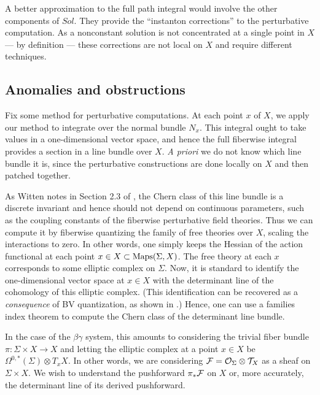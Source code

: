 A better approximation to the full path integral would involve the other components of $Sol$. 
They provide the ``instanton corrections'' to the perturbative computation.
As a nonconstant solution is not concentrated at a single point in $X$ --- by definition --- 
these corrections are not local on $X$ and require different techniques.

\subsection{Anomalies and obstructions}

Fix some method for perturbative computations.
At each point $x$ of $X$, we apply our method to integrate over the normal bundle $N_x$.
This integral ought to take values in a one-dimensional vector space, and 
hence the full fiberwise integral provides a section in a line bundle over $X$.
{\em A priori} we do not know which line bundle it is, 
since the perturbative constructions are done locally on $X$ and then patched together.

As Witten notes in Section 2.3 of \cite{WittenCDO}, the Chern class of this line bundle is a discrete invariant and 
hence should not depend on continuous parameters, 
such as the coupling constants of the fiberwise perturbative field theories.
Thus we can compute it by fiberwise quantizing the family of free theories over $X$,
scaling the interactions to zero.
In other words, one simply keeps the Hessian of the action functional at each point $x \in X \subset {\rm Maps}(\Sigma,X)$.
The free theory at each $x$ corresponds to some elliptic complex on $\Sigma$. 
Now, it is standard to identify the one-dimensional vector space at $x \in X$ with the determinant line of the cohomology of this elliptic complex.
(This identification can be recovered as a {\em consequence} of BV quantization, as shown in \cite{GwHaug}.)
Hence, one can use a families index theorem to compute the Chern class of the determinant line bundle.

In the case of the $\beta\gamma$ system, 
this amounts to considering the trivial fiber bundle $\pi: \Sigma \times X \to X$
and letting the elliptic complex at a point $x \in X$ be $\Omega^{0,*}(\Sigma) \otimes T_x X$.
In other words, we are considering $\mathcal F = \mathcal O_\Sigma \otimes \mathcal T_X$ as a sheaf on $\Sigma \times X$.
We wish to understand the pushforward $\pi_* \mathcal F$ on $X$ or, more accurately, the determinant line of its derived pushforward.

\def\Td{{\rm Td}}

